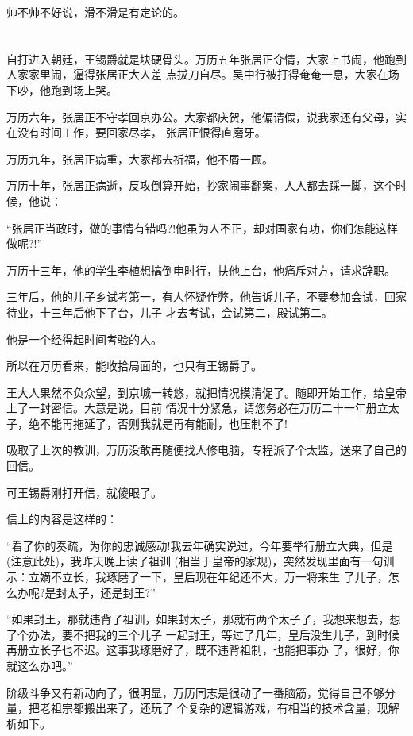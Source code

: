 \documentclass[11pt,a4paper,onecolumn]{article}
\begin{document}
帅不帅不好说，滑不滑是有定论的。

\section[\thesection]{}

自打进入朝廷，王锡爵就是块硬骨头。万历五年张居正夺情，大家上书闹，他跑到人家家里闹，逼得张居正大人差
点拔刀自尽。吴中行被打得奄奄一息，大家在场下吵，他跑到场上哭。

万历六年，张居正不守孝回京办公。大家都庆贺，他偏请假，说我家还有父母，实在没有时间工作，要回家尽孝，
张居正恨得直磨牙。

万历九年，张居正病重，大家都去祈福，他不屑一顾。

万历十年，张居正病逝，反攻倒算开始，抄家闹事翻案，人人都去踩一脚，这个时候，他说：

``张居正当政时，做的事情有错吗?!他虽为人不正，却对国家有功，你们怎能这样做呢?!''

万历十三年，他的学生李植想搞倒申时行，扶他上台，他痛斥对方，请求辞职。

三年后，他的儿子乡试考第一，有人怀疑作弊，他告诉儿子，不要参加会试，回家待业，十三年后他下了台，儿子
才去考试，会试第二，殿试第二。

他是一个经得起时间考验的人。

所以在万历看来，能收拾局面的，也只有王锡爵了。

王大人果然不负众望，到京城一转悠，就把情况摸清促了。随即开始工作，给皇帝上了一封密信。大意是说，目前
情况十分紧急，请您务必在万历二十一年册立太子，绝不能再拖延了，否则我就是再有能耐，也压制不了!

吸取了上次的教训，万历没敢再随便找人修电脑，专程派了个太监，送来了自己的回信。

可王锡爵刚打开信，就傻眼了。

信上的内容是这样的：

``看了你的奏疏，为你的忠诚感动!我去年确实说过，今年要举行册立大典，但是(注意此处)，我昨天晚上读了祖训
(相当于皇帝的家规)，突然发现里面有一句训示：立嫡不立长，我琢磨了一下，皇后现在年纪还不大，万一将来生
了儿子，怎么办呢?是封太子，还是封王?''

``如果封王，那就违背了祖训，如果封太子，那就有两个太子了，我想来想去，想了个办法，要不把我的三个儿子
一起封王，等过了几年，皇后没生儿子，到时候再册立长子也不迟。这事我琢磨好了，既不违背祖制，也能把事办
了，很好，你就这么办吧。''

阶级斗争又有新动向了，很明显，万历同志是很动了一番脑筋，觉得自己不够分量，把老祖宗都搬出来了，还玩了
个复杂的逻辑游戏，有相当的技术含量，现解析如下。
\end{document}
